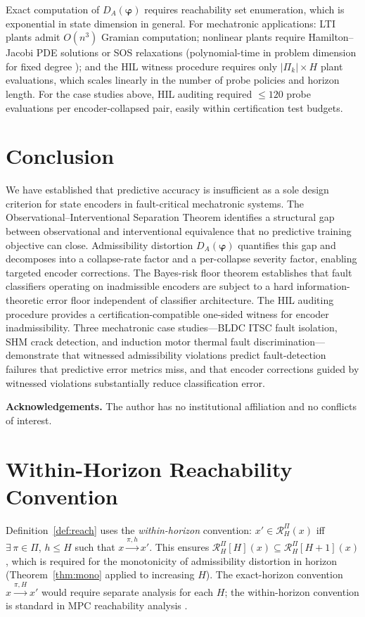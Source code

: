 \documentclass[10pt,twocolumn]{article}
\theoremstyle{plain}
\theoremstyle{definition}
\theoremstyle{remark}
\newcommand{\DA}{D_{A}(\bm{\varphi})}
\newcommand{\RHP}{\mathcal{R}_{H}^{\Pi}}
\begin{document}
Exact computation of $\DA$ requires reachability set enumeration, which
is exponential in state dimension in general. For mechatronic applications:
LTI plants admit $O(n^3)$ Gramian computation; nonlinear plants require
Hamilton--Jacobi PDE solutions or SOS relaxations (polynomial-time in
problem dimension for fixed degree \citep{parrilo2000structured}); and
the HIL witness procedure requires only $|\Pi_k| \times H$ plant evaluations,
which scales linearly in the number of probe policies and horizon length.
For the case studies above, HIL auditing required $\leq 120$ probe
evaluations per encoder-collapsed pair, easily within certification test budgets.

\section{Conclusion}

We have established that predictive accuracy is insufficient as a sole design
criterion for state encoders in fault-critical mechatronic systems. The
Observational--Interventional Separation Theorem identifies a structural gap
between observational and interventional equivalence that no predictive
training objective can close. Admissibility distortion $\DA$ quantifies
this gap and decomposes into a collapse-rate factor and a per-collapse
severity factor, enabling targeted encoder corrections. The Bayes-risk
floor theorem establishes that fault classifiers operating on inadmissible
encoders are subject to a hard information-theoretic error floor independent
of classifier architecture. The HIL auditing procedure provides a
certification-compatible one-sided witness for encoder inadmissibility.
Three mechatronic case studies---BLDC ITSC fault isolation, SHM crack
detection, and induction motor thermal fault discrimination---demonstrate
that witnessed admissibility violations predict fault-detection failures
that predictive error metrics miss, and that encoder corrections guided
by witnessed violations substantially reduce classification error.

\bigskip
\noindent\textbf{Acknowledgements.}
The author has no institutional affiliation and no conflicts of interest.

\appendix
\section{Within-Horizon Reachability Convention}
\label{app:within}
Definition~\ref{def:reach} uses the \emph{within-horizon} convention:
$x' \in \RHP(x)$ iff $\exists\,\pi\in\Pi$, $h \leq H$ such that
$x \xrightarrow{\pi,h} x'$. This ensures $\RHP[H](x) \subseteq \RHP[H+1](x)$,
which is required for the monotonicity of admissibility distortion in horizon
(Theorem~\ref{thm:mono} applied to increasing $H$). The exact-horizon convention
$x \xrightarrow{\pi,H} x'$ would require separate analysis for each $H$; the
within-horizon convention is standard in MPC reachability analysis
\citep{mayne2000model}.
\end{document}
